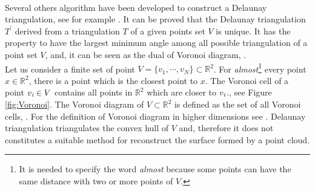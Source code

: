 \\ \indent Several others algorithm have been developed to construct a Delaunay triangulation, see for example \cite{lee1980two, renka1997algorithm}.
It can be proved that the Delaunay triangulation $T^\prime$ derived from a triangulation $T$ of a given points set $V$ is unique. It has the property to have the largest minimum angle among all possible triangulation of a point set $V$, \cite{press2007numerical} and, it can be seen as the dual of Voronoi diagram, \cite{fortune1992voronoi}.\\\indent 
Let us consider a finite set of point $V = \{v_1, \cdots, v_N\}\subset \mathbb{R}^2$. For \textit{almost}\footnote{It is needed to specify the word \textit{almost} because some points can have the same distance with two or more points of $V$.} every point $x\in \mathbb{R}^2$, there is a point which is the closest point to $x$. The Voronoi cell of a point $v_{\textit{i}}\in V$ contains all points in $\mathbb{R}^2$ which are closer to $v_{\textit{i}}$., see Figure \ref{fig:Voronoi}. 
The Voronoi diagram of $V\subset \mathbb{R}^2$ is defined as the set of all Voronoi cells, \cite{cazals2005conformal}.  For the definition of Voronoi diagram in higher dimensions see \cite{brown1979voronoi}.
Delaunay triangulation triangulates the convex hull of $V$ and, therefore it does not constitutes a suitable method for reconstruct the surface formed by a point cloud. 
